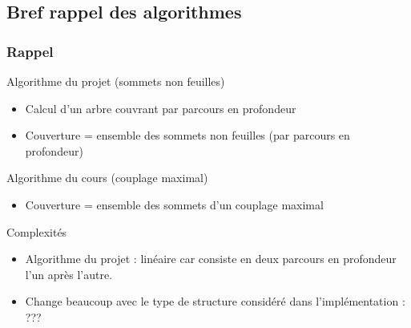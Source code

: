   \subsection{Bref rappel des algorithmes}
  \begin{frame}
   \frametitle{Rappel}

   \begin{block}{Algorithme du projet (sommets non feuilles)}
    \begin{itemize}
     \item Calcul d'un arbre couvrant par parcours en profondeur
     \item Couverture = ensemble des sommets non feuilles (par parcours
	   en profondeur)
    \end{itemize}
   \end{block}

   \begin{block}{Algorithme du cours (couplage maximal)}
    \begin{itemize}
     \item Couverture = ensemble des sommets d'un couplage maximal
    \end{itemize}
   \end{block}

   \begin{block}{Complexités}
    \begin{itemize}
     \item Algorithme du projet : linéaire car consiste en deux parcours
	   en profondeur l'un après l'autre.
     \item Change beaucoup avec le type de structure considéré dans
	   l'implémentation : ???
    \end{itemize}
   \end{block}
  \end{frame}

